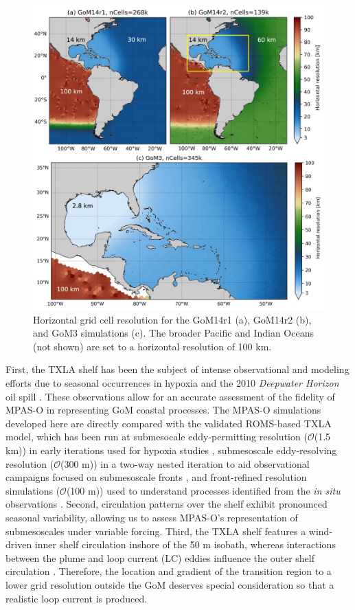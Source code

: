 \begin{figure}[t!]
\centerline{\includegraphics[width = \textwidth]{figures/scgsr/gom_resolutions.jpg}}
    \caption{Horizontal grid cell resolution for the GoM14r1 (a), GoM14r2 (b), and GoM3 simulations (c). The broader Pacific and Indian Oceans (not shown) are set to a horizontal resolution of 100 km.}
    \label{fig:mesh_overview}
\end{figure}

First, the TXLA shelf has been the subject of intense observational and modeling efforts due to seasonal occurrences in hypoxia and the 2010 \textit{Deepwater Horizon} oil spill \citep{bianchi2010science,  dukhovskoy2021development, Zhang_2012_forecast}.  These observations allow for an accurate assessment of the fidelity of MPAS-O in representing GoM coastal processes. The MPAS-O simulations developed here are directly compared with the validated ROMS-based TXLA model, which has been run at submesocale eddy-permitting resolution ($\mathcal{O}$(1.5 km)) in early iterations used for hypoxia studies \citep{ruiz2021small, Zhang_2012_numerical}, submesoscale eddy-resolving resolution ($\mathcal{O}$(300 m)) in a two-way nested iteration to aid observational campaigns focused on submesoscale fronts \citep{Qu_2022_NIW, Schlichting23}, and front-refined resolution simulations ($\mathcal{O}$(100 m)) used to understand processes identified from the {\em in situ} observations \citep{qu2022rapid}. Second, circulation patterns over the shelf exhibit pronounced seasonal variability, allowing us to assess MPAS-O's representation of submesoscales under variable forcing. Third, the TXLA shelf features a wind-driven inner shelf circulation inshore of the 50 m isobath, whereas interactions between the plume and loop current (LC) eddies influence the outer shelf circulation \citep{zhang2014wind}. Therefore, the location and gradient of the transition region to a lower grid resolution outside the GoM deserves special consideration so that a realistic loop current is produced.


